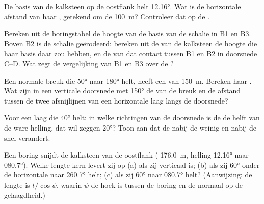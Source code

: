 \begin{exercise}[$\star\star$]\label{exo:b1:cross-sections:7}
De basis van de kalksteen op de oostflank helt \ang{12.16}. Wat is de horizontale afstand van haar ,
getekend om de \qty{100}{m}? Controleer dat op de .
\end{exercise}

\begin{exercise}[$\star\star$]\label{exo:b1:cross-sections:8}
Bereken uit de boringstabel de hoogte van de basis van de schalie in B1 en B3. Boven B2 is de schalie geërodeerd:
bereken uit de  van de kalksteen de hoogte die haar basis daar zou hebben, en de  van
dat contact tussen B1 en B2 in doorsnede C--D. Wat zegt de vergelijking van B1 en B3 over de ?
\end{exercise}

\begin{exercise}[$\star\star$]\label{exo:b1:cross-sections:9}
Een normale breuk die \ang{50} naar \ang{180} helt, heeft een  van \qty{150}{m}. Bereken
haar . Wat zijn in een verticale doorsnede met  \ang{150} de 
van de breuk en de afstand tussen de twee afsnijlijnen van een horizontale laag langs de doorsnede?
\end{exercise}

\begin{exercise}[$\star\star\star$]\label{exo:b1:cross-sections:10}
Voor een laag die \ang{40} helt: in welke richtingen van de doorsnede is de  de helft van de ware
helling, dat wil zeggen \ang{20}? Toon aan dat de  nabij de  weinig en nabij de
 snel verandert.
\end{exercise}

\begin{exercise}[$\star\star\star$]\label{exo:b1:cross-sections:11}
Een boring snijdt de kalksteen van de oostflank ( \qty{176.0}{m}, helling \ang{12.16} naar \ang{080.7}).
Welke lengte kern levert zij op (a) als zij verticaal is; (b) als zij \ang{60} onder de horizontale naar \ang{260.7}
helt; (c) als zij \ang{60} naar \ang{080.7} helt? (Aanwijzing: de lengte is $t/\cos\psi$, waarin $\psi$ de hoek is
tussen de boring en de normaal op de gelaagdheid.)
\end{exercise}

